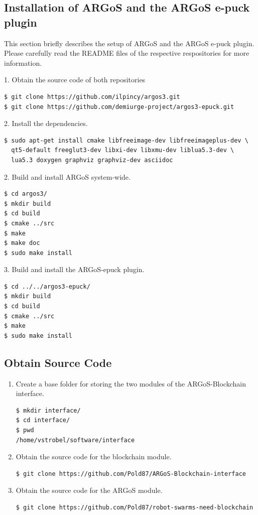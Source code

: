 \documentclass{article}
\begin{document}
\subsection{Installation of ARGoS and the ARGoS e-puck plugin}

This section briefly describes the setup of ARGoS and the ARGoS e-puck
plugin. Please carefully read the README files of the respective
respositories for more information.

1. Obtain the source code of both repositories

\begin{verbatim}
$ git clone https://github.com/ilpincy/argos3.git
$ git clone https://github.com/demiurge-project/argos3-epuck.git
\end{verbatim}

2. Install the dependencies.

\begin{verbatim}
$ sudo apt-get install cmake libfreeimage-dev libfreeimageplus-dev \
  qt5-default freeglut3-dev libxi-dev libxmu-dev liblua5.3-dev \
  lua5.3 doxygen graphviz graphviz-dev asciidoc
\end{verbatim}

2. Build and install ARGoS system-wide.
\begin{verbatim}
$ cd argos3/
$ mkdir build
$ cd build
$ cmake ../src
$ make
$ make doc
$ sudo make install
\end{verbatim}

3. Build and install the ARGoS-epuck plugin.

\begin{verbatim}
$ cd ../../argos3-epuck/
$ mkdir build
$ cd build
$ cmake ../src
$ make
$ sudo make install
\end{verbatim}

\subsection{Obtain Source Code}

\begin{enumerate}[leftmargin=*]
\item Create a base folder for storing the two modules of the
  ARGoS-Blockchain interface.
\begin{verbatim}
$ mkdir interface/
$ cd interface/
$ pwd
/home/vstrobel/software/interface
\end{verbatim}

\item Obtain the source code for the blockchain module.
\begin{verbatim}
$ git clone https://github.com/Pold87/ARGoS-Blockchain-interface
\end{verbatim}

\item Obtain the source code for the ARGoS module.
\begin{verbatim}
$ git clone https://github.com/Pold87/robot-swarms-need-blockchain
\end{verbatim}
\end{enumerate}
\end{document}
